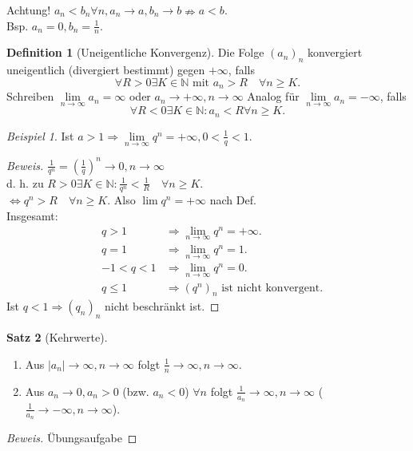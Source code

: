\documentclass[12pt,a4paper,titlepage]{article} %
\theoremstyle{definition}
\newtheorem{satz}{Satz}[subsection]
\newtheorem{defi}[satz]{Definition}
\theoremstyle{remark}
\newtheorem*{bsp}{Beispiel}
\newenvironment{bew}{\begin{proof}[Beweis]}{\end{proof}}
\newcommand{\N}{\mathbb{N}}
\newcommand{\limes}[1]{\lim\limits_{#1\rightarrow\infty}}
\begin{document}
Achtung! \(a_n < b_n \forall n, a_n \rightarrow a, b_n \rightarrow b \nRightarrow  a<b.\)\\Bsp. \(a_n = 0, b_n = \frac{1}{n}\).
\begin{defi}[Uneigentliche Konvergenz]
	Die Folge \((a_n)_n\) konvergiert uneigentlich (divergiert bestimmt) gegen \(+\infty\), falls 
	\[ \forall R>0 \exists K\in\N \text{ mit } a_n >R \quad \forall n\geq K. \]
	Schreiben \( \limes{n} a_n = \infty \) oder \( a_n \rightarrow +\infty, n\rightarrow \infty \)
	Analog für \( \limes{n} a_n = -\infty \), falls 
	\[ \forall R<0 \exists K\in\N: a_n < R \forall n\geq K. \]
\end{defi}
\begin{bsp}
	Ist \(a>1 \Rightarrow \limes{n}q^n = +\infty, 0< \frac{1}{q} < 1. \)
\end{bsp}
\begin{bew}
	\(\frac{1}{q^n} = \left( \frac{1}{q} \right)^n \rightarrow 0, n\rightarrow \infty  \)\\
	d. h. zu \(R>0 \exists K\in\N: \frac{1}{q^n} < \frac{1}{R} \quad \forall n\geq K. \)\\
	\( \Leftrightarrow q^n > R \quad \forall n\geq K. \) Also \(\lim q^n = +\infty \) nach Def.\\
	Insgesamt: 
	\begin{align*}
		&q>1 &\Rightarrow \limes{n}q^n = +\infty.\\
		&q=1 &\Rightarrow \limes{n}q^n = 1.\\
		&-1<q<1 & \Rightarrow \limes{n} q^n = 0.\\
		&q\leq 1 & \Rightarrow (q^n)_n \text{ ist nicht konvergent.}
	\end{align*}
	Ist \( q<1 \Rightarrow (q_n)_n \) nicht beschränkt ist.
\end{bew}
\begin{satz}[Kehrwerte]
	\begin{enumerate}
		\item Aus \( |a_n| \rightarrow \infty, n\rightarrow\infty \) folgt \(\frac{1}{n} \rightarrow\infty,n\rightarrow\infty \).
		\item Aus \( a_n\rightarrow 0, a_n > 0 \) (bzw. \(a_n<0\)) \( \forall n \) folgt \( \frac{1}{a_n} \rightarrow\infty, n\rightarrow\infty \) (\( \frac{1}{a_n} \rightarrow -\infty, n\rightarrow\infty \)).
	\end{enumerate}
\end{satz}
\begin{bew}
	Übungsaufgabe
\end{bew}
\end{document}
